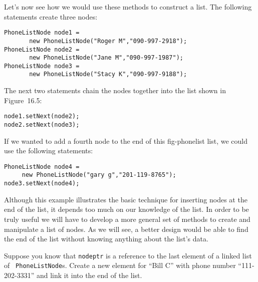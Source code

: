 Let's now see how we would use these methods to construct a list.
The following statements create three nodes:

\begin{jjjlisting}
\begin{lstlisting}
PhoneListNode node1 = 
       new PhoneListNode("Roger M","090-997-2918");
PhoneListNode node2 = 
       new PhoneListNode("Jane M","090-997-1987");
PhoneListNode node3 = 
       new PhoneListNode("Stacy K","090-997-9188");
\end{lstlisting}
\end{jjjlisting}

\noindent The next two statements chain the nodes together into
the list shown in Figure~16.5:

\begin{jjjlisting}
\begin{lstlisting}
node1.setNext(node2);
node2.setNext(node3);
\end{lstlisting}
\end{jjjlisting}

\noindent If we wanted to add a fourth node to the end of this
{fig-phonelist}
list, we could use the following statements:

\begin{jjjlisting}
\begin{lstlisting}
PhoneListNode node4 =
     new PhoneListNode("gary g","201-119-8765");
node3.setNext(node4);
\end{lstlisting}
\end{jjjlisting}

\noindent Although this example illustrates the basic technique
for inserting nodes at the end of the list, it depends too much on our
knowledge of the list.  In order to be truly useful we will have to
develop a more general set of methods to create and manipulate a list
of nodes. As we will see, a better design would be able to find
the end of the list without knowing anything about the list's data.




\pagebreak
{}
\begin{SSTUDY}

\item Suppose you know that {\tt nodeptr} is
a reference to the last element of a linked list of {\tt
PhoneList\-Node}s.  Create a new element for ``Bill C'' with phone
number ``111-202-3331'' and link it into the end of the list.
\end{SSTUDY}

